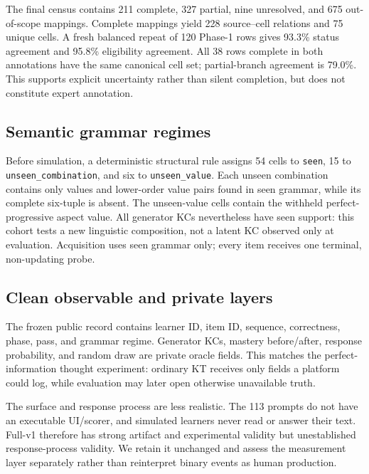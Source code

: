 The final census contains 211 complete, 327 partial, nine unresolved, and 675
out-of-scope mappings.  Complete mappings yield 228 source--cell relations and
75 unique cells.  A fresh balanced repeat of 120 Phase-1 rows gives 93.3\%
status agreement and 95.8\% eligibility agreement.  All 38 rows complete in
both annotations have the same canonical cell set; partial-branch agreement is
79.0\%.  This supports explicit uncertainty rather than silent completion, but
does not constitute expert annotation.

\subsection{Semantic grammar regimes}

Before simulation, a deterministic structural rule assigns 54 cells to
\texttt{seen}, 15 to \texttt{unseen\_combination}, and six to
\texttt{unseen\_value}.  Each unseen combination contains only values and
lower-order value pairs found in seen grammar, while its complete six-tuple is
absent.  The unseen-value cells contain the withheld perfect-progressive aspect
value.  All generator KCs nevertheless have seen support: this cohort tests a
new linguistic composition, not a latent KC observed only at evaluation.
Acquisition uses seen grammar only; every item receives one terminal,
non-updating probe.

\subsection{Clean observable and private layers}

The frozen public record contains learner ID, item ID, sequence, correctness,
phase, pass, and grammar regime.  Generator KCs, mastery before/after, response
probability, and random draw are private oracle fields.  This matches the
perfect-information thought experiment: ordinary KT receives only fields a
platform could log, while evaluation may later open otherwise unavailable
truth.

The surface and response process are less realistic.  The 113 prompts do not
have an executable UI/scorer, and simulated learners never read or answer their
text.  Full-v1 therefore has strong artifact and experimental validity but
unestablished response-process validity.  We retain it unchanged and assess
the measurement layer separately rather than reinterpret binary events as
human production.
